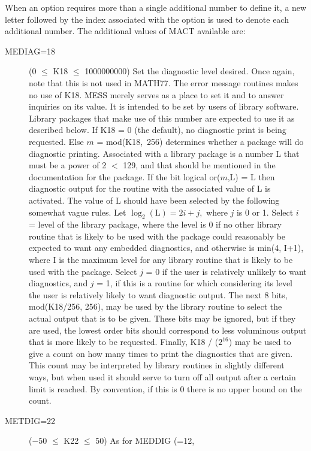 \documentclass[twoside]{MATH77}
\begin{document}
When an option requires more than a single additional number to
define it, a new letter followed by the index associated with the
option is used to denote each additional number.  The additional
values of MACT available are:

\begin{description}
\item[MEDIAG=18]  (0 $\leq $ K18 $\leq $ 1000000000) Set the diagnostic level
  desired.  Once again, note that this is not used in MATH77.
  The error message routines makes no use of K18.  MESS merely
  serves as a place to set it and to answer inquiries on its
  value.  It is intended to be set by users of library
  software.  Library packages that make use of this number
  are expected to use it as described below.  If K18 = 0 (the
  default), no diagnostic print is being requested.  Else $m$ =
  mod(K18,\ 256) determines whether a package will do
  diagnostic printing.  Associated with a library package is
  a number L that must be a power of 2 $<$ 129, and that
  should be mentioned in the documentation for the package.
  If the bit logical or($m$,L) = L then diagnostic output for
  the routine with the associated value of L is activated.
  The value of L should have been selected by the following
  somewhat vague rules.  Let $\log_2(\text{L}) = 2 i + j,$ where $j$
  is 0 or 1.  Select $i$ = level of the library package, where
  the level is 0 if no other library routine that is likely
  to be used with the package could reasonably be expected to
  want any embedded diagnostics, and otherwise is
  min(4, I+1), where I is the maximum level for any library
  routine that is likely to be used with the package.
  Select $j$ = 0 if the user is relatively unlikely to want
  diagnostics, and $j$ = 1, if this is a routine for which
  considering its level the user is relatively likely to want
  diagnostic output.  The next 8 bits, mod(K18/256, 256), may
  be used by the library routine to select the actual output
  that is to be given.  These bits may be ignored,  but if
  they are used, the lowest order bits should correspond to
  less voluminous output that is more likely to be requested.
  Finally, K18 / ($2^{16}$) may be used to give a count on how
  many times to print the diagnostics that are given.  This
  count may be interpreted by library routines in slightly
  different ways, but when used it should serve to turn off
  all output after a certain limit is reached.  By
  convention, if this is 0 there is no upper bound on the
  count.
\item[METDIG=22]  ($-50$ $\leq $ K22 $\leq $ 50) As for MEDDIG (=12,

\end{description}
\end{document}
